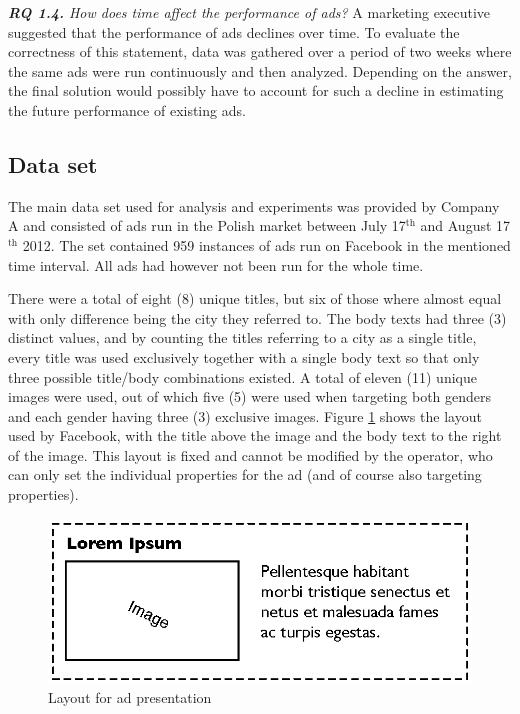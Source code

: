 \documentclass{sig-alternate}
\newcommand{\superscript}[1]{\ensuremath{^{\textrm{#1}}}}
\begin{document}
\textit{\textbf{RQ 1.4.} How does time affect the performance of ads?}
A marketing executive suggested that the performance of ads declines over time. To evaluate the correctness of this statement, data was gathered over a period of two weeks where the same ads were run continuously and then analyzed. Depending on the answer, the final solution would possibly have to account for such a decline in estimating the future performance of existing ads.
\newpage
\subsection{Data set}
The main data set used for analysis and experiments was provided by Company A and consisted of ads run in the Polish market between July 17\superscript{th} and August 17\superscript{th} 2012. The set contained 959 instances of ads run on Facebook in the mentioned time interval. All ads had however not been run for the whole time.

There were a total of eight (8) unique titles, but six of those where almost equal with only difference being the city they referred to. The body texts had three (3) distinct values, and by counting the titles referring to a city as a single title, every title was used exclusively together with a single body text so that only three possible title/body combinations existed. A total of eleven (11) unique images were used, out of which five (5) were used when targeting both genders and each gender having three (3) exclusive images. Figure \ref{fig:AdLayout} shows the layout used by Facebook, with the title above the image and the body text to the right of the image. This layout is fixed and cannot be modified by the operator, who can only set the individual properties for the ad (and of course also targeting properties).

\begin{figure}[htb]
	\centering
	\includegraphics[width=\columnwidth]{ad-layout.eps}
	\caption{Layout for ad presentation}
	\label{fig:AdLayout}
\end{figure}
\end{document}
